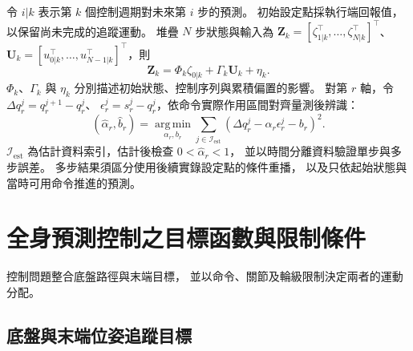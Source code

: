 令 $i|k$ 表示第 $k$ 個控制週期對未來第 $i$ 步的預測。
初始設定點採執行端回報值，以保留尚未完成的追蹤運動。
堆疊 $N$ 步狀態與輸入為
$\mathbf Z_k=[\zeta_{1|k}^\top,\ldots,\zeta_{N|k}^\top]^\top$、
$\mathbf U_k=[u_{0|k}^\top,\ldots,u_{N-1|k}^\top]^\top$，則
\begin{equation}
    \mathbf Z_k=\Phi_k\zeta_{0|k}+\Gamma_k\mathbf U_k+\eta_k .
    \label{eq:ch3_condensed_augmented_prediction}
\end{equation}
$\Phi_k$、$\Gamma_k$ 與 $\eta_k$ 分別描述初始狀態、控制序列與累積偏置的影響。
對第 $r$ 軸，令 $\Delta q_r^j=q_r^{j+1}-q_r^j$、
$\epsilon_r^j=s_r^j-q_r^j$，依命令實際作用區間對齊量測後辨識：
\begin{equation}
    (\hat\alpha_r,\hat b_r)=
    \underset{\alpha_r,b_r}{\operatorname{arg\,min}}
    \sum_{j\in\mathcal I_{\mathrm{est}}}
    \left(\Delta q_r^j-\alpha_r\epsilon_r^j-b_r\right)^2.
    \label{eq:ch3_arm_parameter_identification}
\end{equation}
$\mathcal I_{\mathrm{est}}$ 為估計資料索引，估計後檢查 $0<\hat\alpha_r<1$，
並以時間分離資料驗證單步與多步誤差。
多步結果須區分使用後續實錄設定點的條件重播，
以及只依起始狀態與當時可用命令推進的預測。

\section{全身預測控制之目標函數與限制條件}
\label{sec:wholebody_objective_constraints}

控制問題整合底盤路徑與末端目標，
並以命令、關節及輪級限制決定兩者的運動分配。

\subsection{底盤與末端位姿追蹤目標}
\label{subsec:wholebody_tracking_objective}

